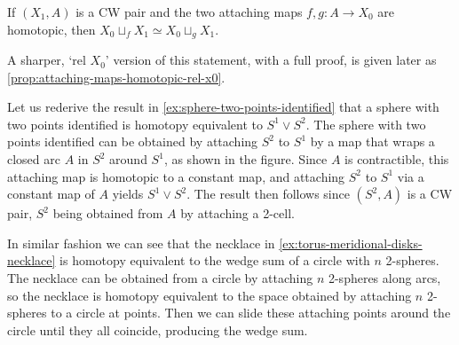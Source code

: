 \begin{proposition}
\label{prop:attaching-homotopic-maps-preview}
If $(X_1,A)$ is a CW pair and the two attaching maps $f,g : A \to X_0$ are
homotopic, then $X_0 \sqcup_f X_1 \simeq X_0 \sqcup_g X_1$.
\end{proposition}

\begin{remark}
\label{rem:attaching-homotopic-maps-sharper-version}
A sharper, `rel $X_0$' version of this statement, with a full proof, is given later as
\cref{prop:attaching-maps-homotopic-rel-x0}.
\end{remark}

\begin{example}
\label{ex:sphere-two-points-identified-via-attaching}
Let us rederive the result in \cref{ex:sphere-two-points-identified} that a sphere with
two points identified is homotopy equivalent to $S^1 \vee S^2$. The sphere with two
points identified can be obtained by attaching $S^2$ to $S^1$ by a map that wraps a
closed arc $A$ in $S^2$ around $S^1$, as shown in the figure. Since $A$ is contractible,
this attaching map is homotopic to a constant map, and attaching $S^2$ to $S^1$ via a
constant map of $A$ yields $S^1 \vee S^2$. The result then follows since $(S^2,A)$ is a CW
pair, $S^2$ being obtained from $A$ by attaching a 2-cell.


\end{example}

\begin{example}
\label{ex:necklace-attaching-spheres-circle}
In similar fashion we can see that the necklace in \cref{ex:torus-meridional-disks-necklace}
is homotopy equivalent to the wedge sum of a circle with $n$ 2-spheres. The necklace
can be obtained from a circle by attaching $n$ 2-spheres along arcs, so the necklace is
homotopy equivalent to the space obtained by attaching $n$ 2-spheres to a circle at
points. Then we can slide these attaching points around the circle until they all
coincide, producing the wedge sum.
\end{example}

